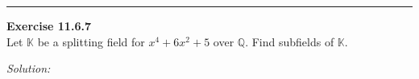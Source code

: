 \documentclass[a4paper, 12pt]{article}
\newenvironment{problem}[2][Exercise]
    { \begin{mdframed}[backgroundcolor=gray!20] \textbf{#1 #2} \\}
    {  \end{mdframed}}
\newenvironment{solution}
    {\textit{Solution:}}
    {}
\begin{document}
\noindent\rule{7in}{2.8pt}
\begin{problem}{11.6.7}
Let \(\mathbb{K}\) be a splitting field for \(x^4+6x^2+5\) over \(\mathbb{Q}\). Find subfields of \(\mathbb{K}\).
\end{problem}
\begin{solution}
    
\end{solution}
\end{document}
